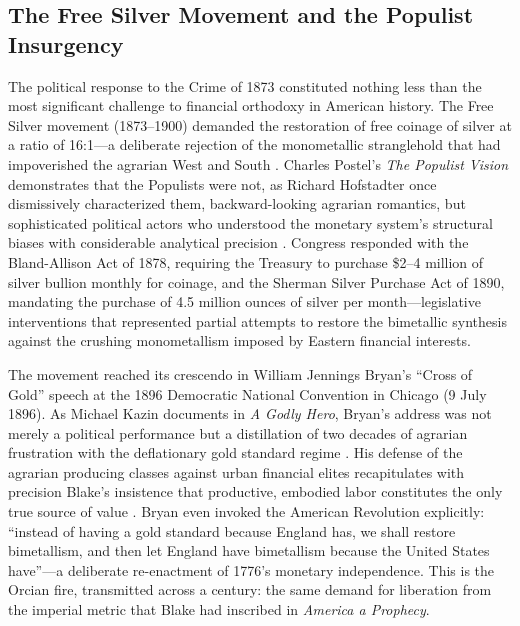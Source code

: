 \documentclass[
]{article}
\begin{document}
\subsection{The Free Silver Movement and the Populist
Insurgency}\label{the-free-silver-movement-and-the-populist-insurgency}

The political response to the Crime of 1873 constituted nothing less
than the most significant challenge to financial orthodoxy in American
history. The Free Silver movement (1873--1900) demanded the restoration
of free coinage of silver at a ratio of 16:1---a deliberate rejection of
the monometallic stranglehold that had impoverished the agrarian West
and South \citep{laughlin1898bimetallism}. Charles Postel's \emph{The
Populist Vision} demonstrates that the Populists were not, as Richard
Hofstadter once dismissively characterized them, backward-looking
agrarian romantics, but sophisticated political actors who understood
the monetary system's structural biases with considerable analytical
precision \citep{postel2007populist, hofstadter1955age}. Congress
responded with the Bland-Allison Act of 1878, requiring the Treasury to
purchase \$2--4 million of silver bullion monthly for coinage, and the
Sherman Silver Purchase Act of 1890, mandating the purchase of 4.5
million ounces of silver per month---legislative interventions that
represented partial attempts to restore the bimetallic synthesis against
the crushing monometallism imposed by Eastern financial interests.

The movement reached its crescendo in William Jennings Bryan's ``Cross
of Gold'' speech at the 1896 Democratic National Convention in Chicago
(9 July 1896). As Michael Kazin documents in \emph{A Godly Hero},
Bryan's address was not merely a political performance but a
distillation of two decades of agrarian frustration with the
deflationary gold standard regime \citep{kazin2006godly}. His defense of
the agrarian producing classes against urban financial elites
recapitulates with precision Blake's insistence that productive,
embodied labor constitutes the only true source of value
\citep{laughlin1898bimetallism}. Bryan even invoked the American
Revolution explicitly: ``instead of having a gold standard because
England has, we shall restore bimetallism, and then let England have
bimetallism because the United States have''---a deliberate re-enactment
of 1776's monetary independence. This is the Orcian fire, transmitted
across a century: the same demand for liberation from the imperial
metric that Blake had inscribed in \emph{America a Prophecy}.
\end{document}
